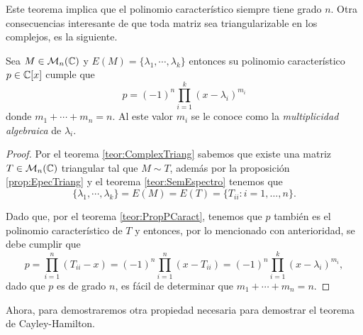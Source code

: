 Este teorema implica que el polinomio característico siempre tiene grado $n$. Otra consecuencias interesante de que toda matriz sea triangularizable en los complejos, es la siguiente.

\begin{prop} \label{prop:FormCaracComplex}
  Sea $M \in \mathcal{M}_n(\mathbb{C})$ y $E(M) = \{\lambda_1, \cdots, \lambda_k\}$ entonces su polinomio característico $p \in \mathbb{C}[x]$ cumple que
    \[
      p = (-1)^n \prod_{i=1}^k (x-\lambda_i)^{m_i}
    \]
  donde $m_1 + \cdots + m_n = n$. Al este valor $m_i$ se le conoce como la \emph{multiplicidad algebraica} de $\lambda_i$.
\end{prop}
\begin{proof}
  Por el teorema \ref{teor:ComplexTriang} sabemos que existe una matriz $T \in \mathcal{M}_n(\mathbb{C})$ triangular tal que $M \sim T$, además por la proposición \ref{prop:EpecTriang} y el teorema \ref{teor:SemEspectro} tenemos que
    \[ \{\lambda_1, \cdots, \lambda_k\} = E(M) = E(T) = \{T_{ii} : i = 1,\ldots,n\}. \]
  
  Dado que, por el teorema \ref{teor:PropPCaract}, tenemos que $p$ también es el polinomio característico de $T$ y entonces, por lo mencionado con anterioridad, se debe cumplir que 
    \[
    p = \prod_{i=1}^n (T_{ii} -x ) = (-1)^n \prod_{i=1}^n (x-T_{ii}) = (-1)^n \prod_{i=1}^k (x-\lambda_i)^{m_i},
    \]
  dado que $p$ es de grado $n$, es fácil de determinar que $m_1 + \cdots + m_n = n$.
\end{proof}

Ahora, para demostraremos otra propiedad necesaria para demostrar el teorema de Cayley-Hamilton.

